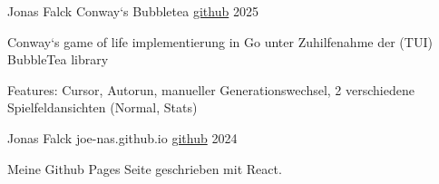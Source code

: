 

\begin{cventries}

\cventry
    {Jonas Falck} %
    {Conway`s Bubbletea} %
    {\href{https://github.com/joe-nas/conways_bubbletea}{github}} %
    {2025} %
    {
      \begin{cvitems} %
        \item {Conway`s game of life implementierung in Go unter Zuhilfenahme der (TUI) BubbleTea library}
        \item {Features: Cursor, Autorun, manueller Generationswechsel, 2 verschiedene Spielfeldansichten (Normal, Stats)}
        \vspace{0.2cm}
        \newline{}  
      \end{cvitems}
    }

    \cventry
    {Jonas Falck} %
    {joe-nas.github.io} %
    {\href{https://github.com/joe-nas/joe-nas.github.io}{github}} %
    {2024} %
    {
      \begin{cvitems} %
        \item {Meine Github Pages Seite geschrieben mit React.}
        \vspace{0.2cm}
        \newline{} 
      \end{cvitems}
    }


\end{cventries}
